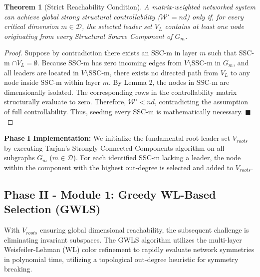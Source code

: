 \documentclass{IEEEtran}
\newtheorem{theorem}{Theorem}
\begin{document}
	\begin{theorem}[Strict Reachability Condition]
		A matrix-weighted networked system can achieve global strong structural controllability ($\mathcal{W}' = nd$) only if, for every critical dimension $m \in \mathcal{D}$, the selected leader set $V_L$ contains at least one node originating from every Structural Source Component of $G_m$.
	\end{theorem}
	\begin{proof}
		Suppose by contradiction there exists an SSC-m in layer $m$ such that SSC-m $\cap V_L = \emptyset$. Because SSC-m has zero incoming edges from $V \setminus \text{SSC-m}$ in $G_m$, and all leaders are located in $V \setminus \text{SSC-m}$, there exists no directed path from $V_L$ to any node inside SSC-m within layer $m$. By Lemma 2, the nodes in SSC-m are dimensionally isolated. The corresponding rows in the controllability matrix structurally evaluate to zero. Therefore, $\mathcal{W}' < nd$, contradicting the assumption of full controllability. Thus, seeding every SSC-m is mathematically necessary. \hfill $\blacksquare$
	\end{proof}
	
	\textbf{Phase I Implementation:} We initialize the fundamental root leader set $V_{roots}$ by executing Tarjan's Strongly Connected Components algorithm on all subgraphs $G_m$ ($m \in \mathcal{D}$). For each identified SSC-m lacking a leader, the node within the component with the highest out-degree is selected and added to $V_{roots}$.
	
	\subsection{Phase II - Module 1: Greedy WL-Based Selection (GWLS)}
	With $V_{roots}$ ensuring global dimensional reachability, the subsequent challenge is eliminating invariant subspaces. The GWLS algorithm utilizes the multi-layer Weisfeiler-Lehman (WL) color refinement to rapidly evaluate network symmetries in polynomial time, utilizing a topological out-degree heuristic for symmetry breaking.
	
\end{document}
